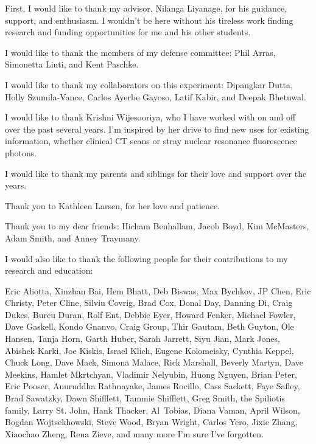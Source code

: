 First, I would like to thank my advisor, Nilanga Liyanage, for his guidance,
support, and enthusiasm.
I wouldn't be here without his tireless work finding research and funding
opportunities for me and his other students.

I would like to thank the members of my defense committee:
Phil Arras,
Simonetta Liuti,
and
Kent Paschke.

I would like to thank my collaborators on this experiment:
Dipangkar Dutta,
Holly Szumila-Vance,
Carlos Ayerbe Gayoso,
Latif Kabir,
and
Deepak Bhetuwal.

I would like to thank Krishni Wijesooriya, who I have worked with on and off
over the past several years.
I'm inspired by her drive to find new uses for existing information,
whether clinical CT scans or stray nuclear resonance fluorescence photons.

I would like to thank my parents and siblings for their love and
support over the years.

Thank you to Kathleen Larsen, for her love and patience.

Thank you to my dear friends:
Hicham Benhallam,
Jacob Boyd,
Kim McMasters,
Adam Smith,
and
Anney Traymany.

I would also like to thank the following people for
their contributions to my research and education:

Eric Aliotta,
Xinzhan Bai,
Hem Bhatt,
Deb Biswas,
Max Bychkov,
JP Chen,
Eric Christy,
Peter Cline,
Silviu Covrig,
Brad Cox,
Donal Day,
Danning Di,
Craig Dukes,
Burcu Duran,
Rolf Ent,
Debbie Eyer,
Howard Fenker,
Michael Fowler,
Dave Gaskell,
Kondo Gnanvo,
Craig Group,
Thir Gautam,
Beth Guyton,
Ole Hansen,
Tanja Horn,
Garth Huber,
Sarah Jarrett,
Siyu Jian,
Mark Jones,
Abishek Karki,
Joe Kiskis,
Israel Klich,
Eugene Kolomeisky,
Cynthia Keppel,
Chuck Long,
Dave Mack,
Simona Malace,
Rick Marshall,
Beverly Martyn,
Dave Meekins,
Hamlet Mkrtchyan,
Vladimir Nelyubin,
Huong Nguyen,
Brian Peter,
Eric Pooser,
Anuruddha Rathnayake,
James Rocillo,
Cass Sackett,
Faye Safley,
Brad Sawatzky,
Dawn Shifflett,
Tammie Shifflett,
Greg Smith,
the Spiliotis family,
Larry St. John,
Hank Thacker,
Al Tobias,
Diana Vaman,
April Wilson,
Bogdan Wojtsekhowski,
Steve Wood,
Bryan Wright,
Carlos Yero,
Jixie Zhang,
Xiaochao Zheng,
Rena Zieve,
and many more I'm sure I’ve forgotten.
